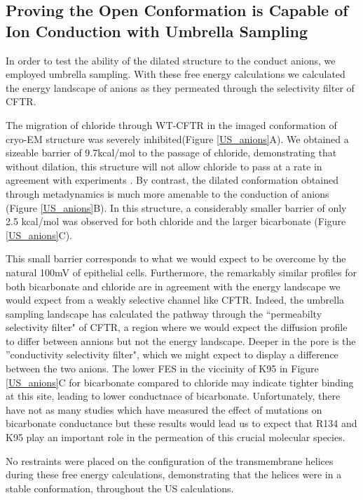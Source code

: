 \subsection{Proving the Open Conformation is Capable of Ion Conduction with Umbrella Sampling}

In order to test the ability of the dilated structure to the conduct anions, we employed umbrella sampling. With these free energy calculations we calculated the energy landscape of anions as they permeated through the selectivity filter of CFTR. 

The migration of chloride through WT-CFTR in the imaged conformation of cryo-EM structure was severely inhibited(Figure \ref{US_anions}A). We obtained a sizeable barrier of 9.7kcal/mol to the passage of chloride, demonstrating that without dilation, this structure will not allow chloride to pass at a rate in agreement with experiments \cite{} . By contrast, the dilated conformation obtained through metadynamics is much more amenable to the conduction of anions (Figure \ref{US_anions}B). In this structure, a considerably smaller barrier of only 2.5 kcal/mol was observed for both chloride and the larger bicarbonate (Figure \ref{US_anions}C). 

This small barrier corresponds to what we would expect to be overcome by the natural 100mV  of epithelial cells. Furthermore, the remarkably similar profiles for both bicarbonate and chloride are in agreement with the energy landscape we would expect from a weakly selective channel like CFTR. Indeed, the umbrella sampling landscape has calculated the pathway through the ``permeabilty selectivity filter" of CFTR, a region where we would expect the diffusion profile to differ between annions but not the energy landscape. Deeper in the pore is the ''conductivity selectivity filter", which we might expect to display a difference between the two anions. The lower FES in the viccinity of K95 in Figure \ref{US_anions}C for bicarbonate compared to chloride may indicate tighter binding at this site, leading to lower conductnace of bicarbonate. Unfortunately, there have not as many studies which have measured the effect of mutations on bicarbonate conductance but these results would lead us to expect that R134 and K95 play an important role in the permeation of this crucial molecular species. 

No restraints were placed on the configuration of the transmembrane helices during these free energy calculations, demonstrating that the helices were in a stable conformation, throughout  the US calculations. 

